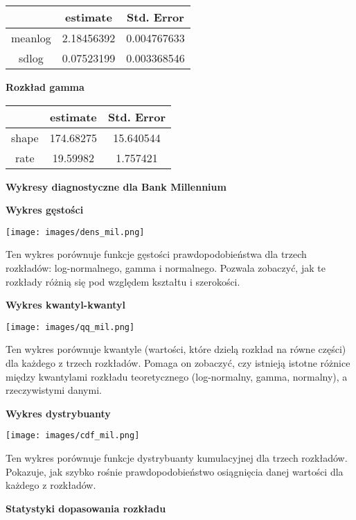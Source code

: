 \documentclass[12pt]{article}
\begin{document}
\begin{table}[h]
\centering
\begin{tabular}{|c|c|c|}
\hline
 & estimate & Std. Error \\
\hline
meanlog & 2.18456392 & 0.004767633 \\
\hline
sdlog & 0.07523199 & 0.003368546 \\
\hline
\end{tabular}
\end{table}
\vspace{0.5 cm}
{\bf Rozkład gamma}
\vspace{0.5 cm}
\begin{table}[h!]
\centering
\begin{tabular}{|c|c|c|}
\hline
 & estimate & Std. Error \\
\hline
shape & 174.68275 & 15.640544 \\
\hline
rate & 19.59982 & 1.757421 \\
\hline
\end{tabular}
\end{table}
\clearpage

{\bf \large Wykresy diagnostyczne dla Bank Millennium}
    
{\bf \medium Wykres gęstości}

\centerline{\texttt{[image: images/dens\_mil.png]}}
Ten wykres porównuje funkcje gęstości prawdopodobieństwa dla trzech rozkładów: log-normalnego, gamma i normalnego. Pozwala zobaczyć, jak te rozkłady różnią się pod względem kształtu i szerokości.

{\bf \medium Wykres kwantyl-kwantyl}

\centerline{\texttt{[image: images/qq\_mil.png]}}
Ten wykres porównuje kwantyle (wartości, które dzielą rozkład na równe części) dla każdego z trzech rozkładów. Pomaga on zobaczyć, czy istnieją istotne różnice między kwantylami rozkładu teoretycznego (log-normalny, gamma, normalny), a rzeczywistymi danymi.

\vspace{0,5 cm}

{\bf \medium Wykres dystrybuanty}

\centerline{\texttt{[image: images/cdf\_mil.png]}}
Ten wykres porównuje funkcje dystrybuanty kumulacyjnej dla trzech rozkładów. Pokazuje, jak szybko rośnie prawdopodobieństwo osiągnięcia danej wartości dla każdego z rozkładów.


{\bf \large Statystyki dopasowania rozkładu}
\end{document}
